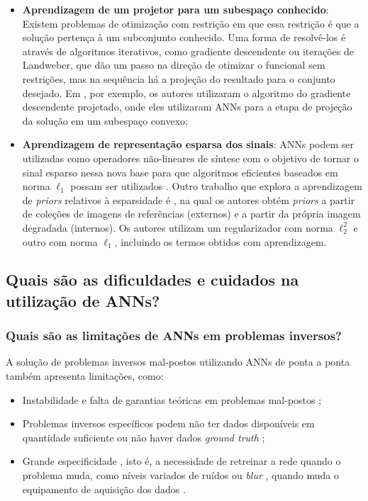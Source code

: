 \begin{itemize}
\item \textbf{Aprendizagem de um projetor para um subespaço conhecido}: Existem problemas de otimização com restrição em que essa restrição é que a solução pertença à um subconjunto conhecido. Uma forma de resolvê-los é através de algoritmos iterativos, como gradiente descendente ou iterações de Landweber, que dão um passo na direção de otimizar o funcional sem restrições, mas na sequência há a projeção do resultado para o conjunto desejado. Em \cite{Gupta2018}, por exemplo, os autores utilizaram o algoritmo do gradiente descendente projetado, onde eles utilizaram ANNs para a etapa de projeção da solução em um subespaço convexo;


\item \textbf{Aprendizagem de representação esparsa dos sinais}: ANNs podem ser utilizadas como operadores não-lineares de síntese com o objetivo de tornar o sinal esparso nessa nova base para que algoritmos eficientes baseados em norma $\ell_1$ possam ser utilizados \cite[Equação 6]{Obmann2020}. Outro trabalho que explora a aprendizagem de \textit{priors} relativos à esparsidade é \cite{Wu2021}, na qual os autores obtém \textit{priors} a partir de coleções de imagens de referências (externos) e a partir da própria imagem degradada (internos). Os autores utilizam um regularizador com norma $\ell_2^2$ e outro com norma $\ell_1$, incluindo os termos obtidos com aprendizagem.   


\end{itemize}








\subsection{Quais são as dificuldades e cuidados na utilização de ANNs?}

\subsubsection{Quais são as limitações de ANNs em problemas inversos?}

A solução de problemas inversos mal-postos utilizando ANNs de ponta a ponta também apresenta limitações, como:
\begin{itemize}
\item Instabilidade e falta de garantias teóricas em problemas mal-postos \cite{Arridge1, Gottschling2020, LewisD2019};

\item Problemas inversos específicos podem não ter dados disponíveis em quantidade suficiente \cite{LewisD2019} ou não haver dados \textit{ground truth} \cite{Benning2018};
\item Grande especificidade \cite{Chang_2017_ICCV}, isto é, a necessidade de retreinar a rede quando o problema muda, como níveis variados de ruídos ou \textit{blur} \cite{LewisD2019}, quando muda o equipamento de aquisição dos dados \cite{Arridge2019}.
\end{itemize}

